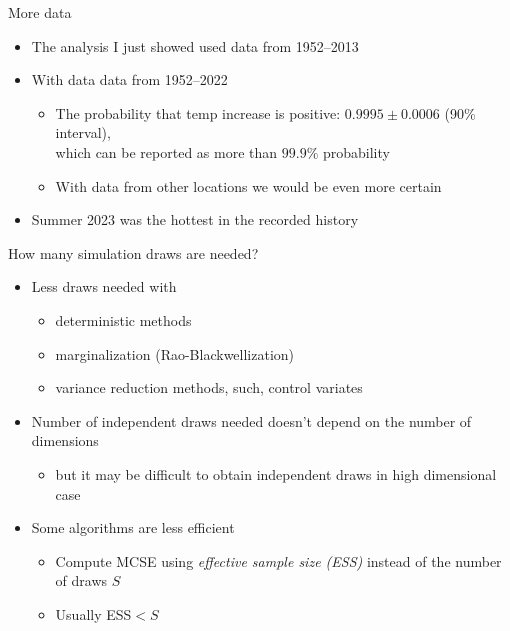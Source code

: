 \documentclass[english,t]{beamer}
\begin{document}
\begin{frame}{More data}

  \begin{itemize}
  \item<+-> The analysis I just showed used data from 1952--2013
  \item<+-> With data data from 1952--2022
    \begin{itemize}
    \item The probability that temp increase is positive:
      $0.9995 \pm 0.0006$ (90\% interval),\\ which can be reported as more than
      $99.9\%$ probability
    \item With data from other locations we would be even more certain
    \end{itemize}
  \item<+-> Summer 2023 was the hottest in the recorded history
  \end{itemize}

\end{frame}


\begin{frame}{How many simulation draws are needed?}

  \begin{itemize}
  \item Less draws needed with
    \begin{itemize}
    \item deterministic methods
    \item marginalization (Rao-Blackwellization)
    \item variance reduction methods, such, control variates
    \end{itemize}
  \item<2-> Number of independent draws needed doesn't depend on the
    number of dimensions
    \begin{itemize}
    \item but it may be difficult to obtain independent draws in high
      dimensional case
    \end{itemize}
  \item<3-> Some algorithms are less efficient
    \begin{itemize}
    \item Compute MCSE using \textit{effective sample size (ESS)}
      instead of the number of draws $S$
    \item Usually ESS$<S$
    \end{itemize}
  \end{itemize}

\end{frame}
\end{document}
